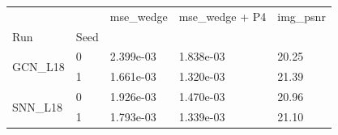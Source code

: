 \begin{tabular}{lllll}
\toprule
 &  & mse\_wedge & mse\_wedge + P4 & img\_psnr \\
Run & Seed &  &  &  \\
\midrule
\multirow[t]{2}{*}{GCN\_L18} & 0 & 2.399e-03 & 1.838e-03 & 20.25 \\
 & 1 & 1.661e-03 & 1.320e-03 & 21.39 \\
\cline{1-5}
\multirow[t]{2}{*}{SNN\_L18} & 0 & 1.926e-03 & 1.470e-03 & 20.96 \\
 & 1 & 1.793e-03 & 1.339e-03 & 21.10 \\
\cline{1-5}
\bottomrule
\end{tabular}
